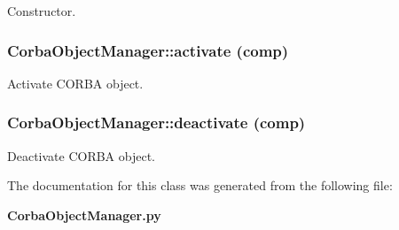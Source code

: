 Constructor. 

\subsubsection{\setlength{\rightskip}{0pt plus 5cm}Corba\-Object\-Manager::activate (comp)}\label{classCorbaObjectManager_CorbaObjectManagera2}


Activate CORBA object. 

\subsubsection{\setlength{\rightskip}{0pt plus 5cm}Corba\-Object\-Manager::deactivate (comp)}\label{classCorbaObjectManager_CorbaObjectManagera3}


Deactivate CORBA object. 



The documentation for this class was generated from the following file:\begin{CompactItemize}
\item 
{\bf Corba\-Object\-Manager.py}\end{CompactItemize}

